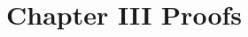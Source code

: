 \documentclass[11pt, twoside]{report}
\begin{document}
\chapter{Chapter III Proofs}
\label{Bayesian_proofs}

\end{document}
